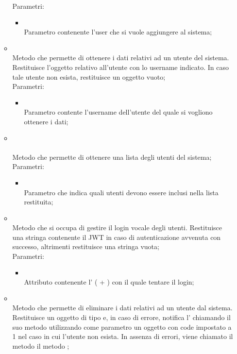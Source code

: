 \begin{itemize}
\begin{itemize}
		Parametri:
		\begin{itemize}
			\item {} \\
			Parametro contenente l'user che si vuole aggiungere al sistema;
		\end{itemize}
		\item[]  \\		Metodo che permette di ottenere i dati relativi ad un utente del sistema. Restituisce l'oggetto  relativo all'utente con lo username indicato. In caso tale utente non esista, restituisce un oggetto vuoto;\\
		Parametri:
		\begin{itemize}
			\item {} \\
			Parametro contente l'username dell'utente del quale si vogliono ottenere i dati;
		\end{itemize}
		\item[] \\ \\		Metodo che permette di ottenere una lista degli utenti del sistema;\\
		Parametri:
		\begin{itemize}
			\item {} \\
			Parametro che indica quali utenti devono essere inclusi nella lista restituita;
		\end{itemize}
		\item[]  \\		Metodo che si occupa di gestire il login vocale degli utenti. Restituisce una stringa contenente il JWT in caso di autenticazione avvenuta con successo, altrimenti restituisce una stringa vuota;\\
		Parametri:
		\begin{itemize}
			\item {} \\
			Attributo contenente l' ( + ) con il quale tentare il login;
		\end{itemize}
		\item[]  \\		Metodo che permette di eliminare i dati relativi ad un utente dal sistema. Restituisce un oggetto di tipo  e, in caso di errore, notifica l' chiamando il suo metodo  utilizzando come parametro un oggetto  con code impostato a 1 nel caso in cui l'utente non esista. In assenza di errori, viene chiamato il metodo il metodo ;\\

\end{itemize}
\end{itemize}
